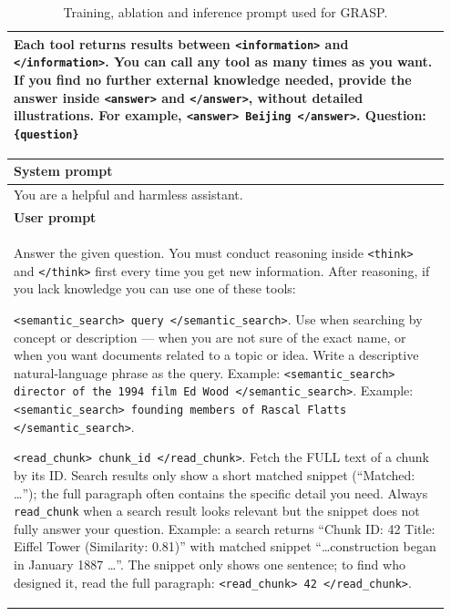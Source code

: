 \documentclass[11pt]{article}
\begin{document}
\begin{table}[t]
\begin{tabular}{p{0.95\linewidth}}
Each tool returns results between \texttt{\textless{}information\textgreater{}} and \texttt{\textless{}/information\textgreater{}}. You can call any tool as many times as you want. If you find no further external knowledge needed, provide the answer inside \texttt{\textless{}answer\textgreater{}} and \texttt{\textless{}/answer\textgreater{}}, without detailed illustrations. For example, \texttt{\textless{}answer\textgreater{} Beijing \textless{}/answer\textgreater{}}. Question: \texttt{\{question\}} \\
\hline
\end{tabular}
\caption{Training, ablation and inference prompt used for GRASP.}
\label{tab:our_prompt}
\end{table}

\begin{table}[t]
\centering
\small
\begin{tabular}{p{0.95\linewidth}}
\hline
\textbf{System prompt} \\
\hline
You are a helpful and harmless assistant. \\
\hline
\textbf{User prompt} \\
\hline
Answer the given question. You must conduct reasoning inside \texttt{\textless{}think\textgreater{}} and \texttt{\textless{}/think\textgreater{}} first every time you get new information. After reasoning, if you lack knowledge you can use one of these tools:

\quad \texttt{\textless{}semantic\_search\textgreater{} query \textless{}/semantic\_search\textgreater{}}.
Use when searching by concept or description --- when you are not sure of the exact name, or when you want documents related to a topic or idea. Write a descriptive natural-language phrase as the query.
Example: \texttt{\textless{}semantic\_search\textgreater{} director of the 1994 film Ed Wood \textless{}/semantic\_search\textgreater{}}.
Example: \texttt{\textless{}semantic\_search\textgreater{} founding members of Rascal Flatts \textless{}/semantic\_search\textgreater{}}.

\quad \texttt{\textless{}read\_chunk\textgreater{} chunk\_id \textless{}/read\_chunk\textgreater{}}.
Fetch the FULL text of a chunk by its ID. Search results only show a short matched snippet (``Matched: \ldots''); the full paragraph often contains the specific detail you need. Always \texttt{read\_chunk} when a search result looks relevant but the snippet does not fully answer your question.
Example: a search returns ``Chunk ID: 42 \textbar{} Title: Eiffel Tower (Similarity: 0.81)'' with matched snippet ``\ldots construction began in January 1887 \ldots''. The snippet only shows one sentence; to find who designed it, read the full paragraph: \texttt{\textless{}read\_chunk\textgreater{} 42 \textless{}/read\_chunk\textgreater{}}.


\end{tabular}
\end{table}
\end{document}
